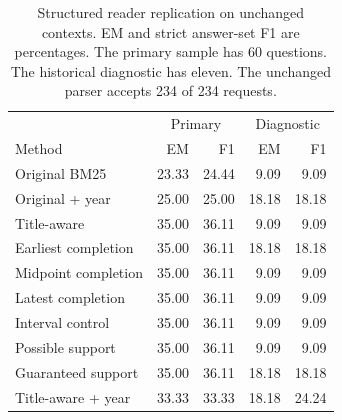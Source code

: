 \begin{table}[t]
\centering\footnotesize
\setlength{\tabcolsep}{3pt}
\begin{tabular}{@{}lrrrr@{}}
\toprule
 & \multicolumn{2}{c}{Primary} & \multicolumn{2}{c}{Diagnostic}\\
Method & EM & F1 & EM & F1\\
\midrule
Original BM25 & 23.33 & 24.44 & 9.09 & 9.09\\
Original + year & 25.00 & 25.00 & 18.18 & 18.18\\
Title-aware & 35.00 & 36.11 & 9.09 & 9.09\\
Earliest completion & 35.00 & 36.11 & 18.18 & 18.18\\
Midpoint completion & 35.00 & 36.11 & 9.09 & 9.09\\
Latest completion & 35.00 & 36.11 & 9.09 & 9.09\\
Interval control & 35.00 & 36.11 & 9.09 & 9.09\\
Possible support & 35.00 & 36.11 & 9.09 & 9.09\\
Guaranteed support & 35.00 & 36.11 & 18.18 & 18.18\\
Title-aware + year & 33.33 & 33.33 & 18.18 & 24.24\\
\bottomrule
\end{tabular}
\caption{Structured reader replication on unchanged contexts. EM and strict answer-set F1 are percentages. The primary sample has 60 questions. The historical diagnostic has eleven. The unchanged parser accepts 234 of 234 requests.}
\label{tab:structured_reader}
\end{table}
